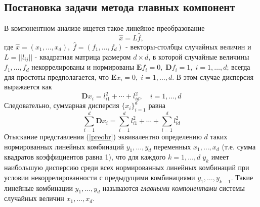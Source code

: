 \documentclass[a4paper]{article}
\begin{document}
\subsection{Постановка задачи метода главных компонент}
В компонентном анализе ищется такое линейное преобразование 
\begin{equation}\label{preobr}
    \widehat{x}=L\widehat{f},
\end{equation}
где $\widehat{x}=(x_1,\hdots,x_d),\;\widehat{f}=(f_1,\hdots,f_d)$ - векторы-столбцы случайных величин и $L=||l_{ij}||$ - квадратная матрица размером $d\times d$, в которой случайные величины $f_1,\hdots,f_d$ некоррелированы и нормированы $\mathbf{E}f_i=0,\; \mathbf{D}f_i=1,\;i=1,\hdots,d$; всегда для простоты предполагается, что $\mathbf{E}x_i=0,\;i=1,\hdots,d$. В этом случае дисперсия выражается как $$\mathbf{D}x_i=l_{i1}^2+\cdots+l_{id}^2,\quad i=1,\hdots, d$$
Следовательно, суммарная дисперсия $\{x_i\}_{i=1}^d$ равна 
\begin{equation}\label{summa}
\sum\limits_{i=1}^d\mathbf{D}x_i=\sum\limits_{i=1}^dl_{i1}^2+\cdots+\sum\limits_{i=1}^dl_{id}^2
\end{equation}
Отыскание представления (\ref{preobr}) эквивалентно определению $d$ таких нормированных линейных комбинаций $y_1,\dots,y_d$ переменных $x_1,\dots,x_d$ (т.е. сумма квадратов коэффициентов равна 1), что для каждого $k=1,\dots,d\;y_k$ имеет наибольшую дисперсию среди всех нормированных линейных комбинаций при условии некоррелированности с предыдущими комбинациями $y_1,\dots,y_{k-1}$. Такие линейные комбинации $y_1,\dots,y_d$ называются \textit{главными компонентами} системы случайных величин $x_1,\dots,x_d$.
\end{document}
